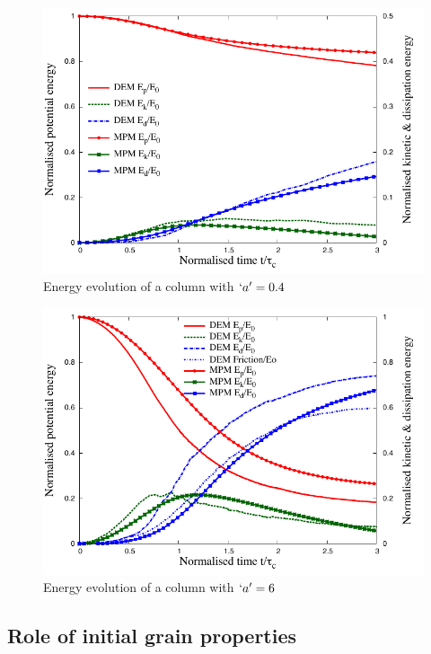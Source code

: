 \begin{figure}[tbhp]
\centering
\includegraphics[width=\textwidth]{a04_energy}
\caption{Energy evolution of a column with $`a'=0.4$}
\label{fig:a04_energy}
\end{figure}

\begin{figure}[tbhp]
\centering
\includegraphics[width=\textwidth]{a6_energy}
\caption{Energy evolution of a column with $`a'=6$}
\label{fig:a6_energy}
\end{figure}

\subsection{Role of initial grain properties}

